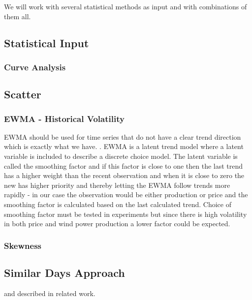 We will work with several statistical methods as input and with combinations of them all. 

\subsection{Statistical Input}
\subsubsection{Curve Analysis}
\label{sec:curveAnalysis}
\subsection{Scatter}
\subsubsection{EWMA - Historical Volatility}
\label{sec:ewmaVolatility}

EWMA should be used for time series that do not have a clear trend direction\cite[Chapter~7.3.2]{econometrics} which is exactly what we have. . EWMA is a latent trend model where a latent variable is included to describe a discrete choice model. The latent variable is called the smoothing factor and if this factor is close to one then the last trend has a higher weight than the recent observation and when it is close to zero the new has higher priority and thereby letting the EWMA follow trends more rapidly - in our case the observation would be either production or price and the smoothing factor is calculated based on the last calculated trend. Choice of smoothing factor must be tested in experiments but since there is high volatility in both price and wind power production a lower factor could be expected. 

\subsubsection{Skewness}
\label{sec:skewness}

\subsection{Similar Days Approach}
\label{sec:sdmApproach}
\cite{pjmForecast} and described in related work.

